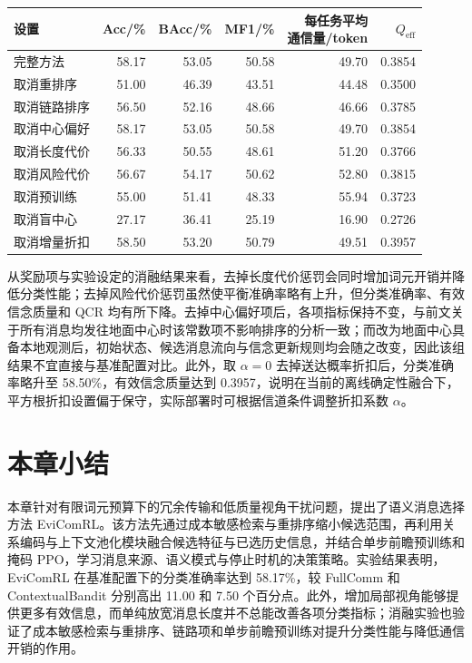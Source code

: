 \begin{table}[htbp]
\centering\small
{}
\label{rq2:tab:ablation}
\begin{tabular}{lrrrrr}
\toprule
设置 & Acc/\% & BAcc/\% & MF1/\% & \shortstack{每任务平均\\通信量/token} & $Q_{\mathrm{eff}}$\\
\midrule
完整方法 & 58.17 & 53.05 & 50.58 & 49.70 & 0.3854\\
取消重排序 & 51.00 & 46.39 & 43.51 & 44.48 & 0.3500\\
取消链路排序 & 56.50 & 52.16 & 48.66 & 46.66 & 0.3785\\
取消中心偏好 & 58.17 & 53.05 & 50.58 & 49.70 & 0.3854\\
取消长度代价 & 56.33 & 50.55 & 48.61 & 51.20 & 0.3766\\
取消风险代价 & 56.67 & 54.17 & 50.62 & 52.80 & 0.3815\\
取消预训练 & 55.00 & 51.41 & 48.33 & 55.94 & 0.3723\\
取消盲中心 & 27.17 & 36.41 & 25.19 & 16.90 & 0.2726\\
取消增量折扣 & 58.50 & 53.20 & 50.79 & 49.51 & 0.3957\\
\bottomrule
\end{tabular}
\end{table}

从奖励项与实验设定的消融结果来看，去掉长度代价惩罚会同时增加词元开销并降低分类性能；去掉风险代价惩罚虽然使平衡准确率略有上升，但分类准确率、有效信念质量和 QCR 均有所下降。去掉中心偏好项后，各项指标保持不变，与前文关于所有消息均发往地面中心时该常数项不影响排序的分析一致；而改为地面中心具备本地观测后，初始状态、候选消息流向与信念更新规则均会随之改变，因此该组结果不宜直接与基准配置对比。此外，取 $\alpha=0$ 去掉送达概率折扣后，分类准确率略升至 58.50\%，有效信念质量达到 0.3957，说明在当前的离线确定性融合下，平方根折扣设置偏于保守，实际部署时可根据信道条件调整折扣系数 $\alpha$。


\section{本章小结}
\label{rq2:sec:summary}

本章针对有限词元预算下的冗余传输和低质量视角干扰问题，提出了语义消息选择方法 EviComRL。该方法先通过成本敏感检索与重排序缩小候选范围，再利用关系编码与上下文池化模块融合候选特征与已选历史信息，并结合单步前瞻预训练和掩码 PPO，学习消息来源、语义模式与停止时机的决策策略。实验结果表明，EviComRL 在基准配置下的分类准确率达到 58.17\%，较 FullComm 和 ContextualBandit 分别高出 11.00 和 7.50 个百分点。此外，增加局部视角能够提供更多有效信息，而单纯放宽消息长度并不总能改善各项分类指标；消融实验也验证了成本敏感检索与重排序、链路项和单步前瞻预训练对提升分类性能与降低通信开销的作用。
